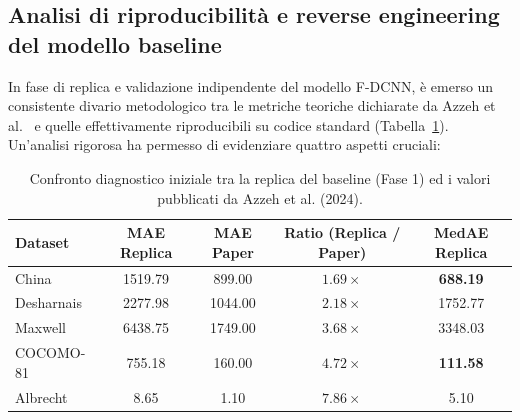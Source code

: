 \documentclass[11pt, a4paper]{article}
\begin{document}
\subsection{Analisi di riproducibilità e reverse engineering del modello baseline}
In fase di replica e validazione indipendente del modello F-DCNN, è emerso un consistente divario metodologico tra le metriche teoriche dichiarate da Azzeh et al.~\cite{article} e quelle effettivamente riproducibili su codice standard (Tabella~\ref{tab:baseline_gap}). Un'analisi rigorosa ha permesso di evidenziare quattro aspetti cruciali:

\begin{table}[htbp]
    \centering
    \caption{Confronto diagnostico iniziale tra la replica del baseline (Fase 1) ed i valori pubblicati da Azzeh et al. (2024).}\label{tab:baseline_gap}
    \small
    \begin{tabular}{lcccc}
        \toprule
        \rowcolor{tableheader} \textbf{Dataset} & \textbf{MAE Replica} & \textbf{MAE Paper} & \textbf{Ratio (Replica / Paper)} & \textbf{MedAE Replica} \\
        \midrule
        China                                   & 1519.79              & 899.00             & $1.69\times$                     & \textbf{688.19}        \\
        Desharnais                              & 2277.98              & 1044.00            & $2.18\times$                     & 1752.77                \\
        Maxwell                                 & 6438.75              & 1749.00            & $3.68\times$                     & 3348.03                \\
        COCOMO-81                               & 755.18               & 160.00             & $4.72\times$                     & \textbf{111.58}        \\
        \rowcolor{lightbg} Albrecht             & 8.65                 & 1.10               & $7.86\times$                     & 5.10                   \\
        \bottomrule
    \end{tabular}
\end{table}
\end{document}
